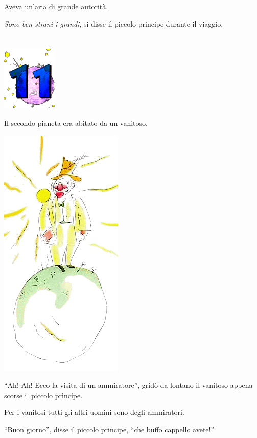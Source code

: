 \documentclass[11pt]{scrbook}
\begin{document}
Aveva un'aria di grande autorità.

\emph{Sono ben strani i grandi}, si disse il piccolo principe durante il viaggio.

\chapter{}
\begin{center}
\includegraphics{img/chapter11}
\end{center}

Il secondo pianeta era abitato da un vanitoso.

\begin{center}
\includegraphics{img/11a}
\end{center}

``Ah! Ah! Ecco la visita di un ammiratore'', gridò da lontano il vanitoso appena scorse il piccolo principe.

Per i vanitosi tutti gli altri uomini sono degli ammiratori.

``Buon giorno'', disse il piccolo principe, ``che buffo cappello avete!''
\end{document}
